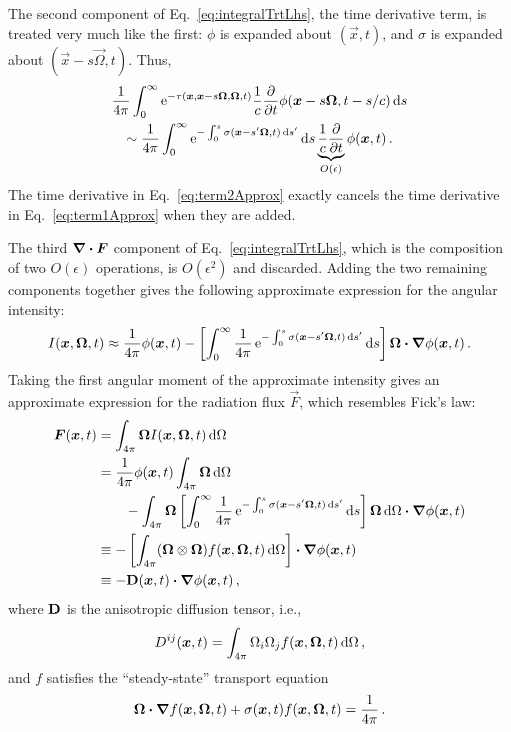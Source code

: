 \documentclass[11pt,letter,twoside]{mc2011}
\newcommand{\Dtens}{\mat{D}}
\begin{document}
The second component of Eq.~\eqref{eq:integralTrtLhs}, the time derivative
term, is treated very much like the first: $\phi$ is expanded about
$(\vec{x},t)$, and $\sigma$ is expanded about $(\vec{x}-s\vec{\Omega},t)$. Thus,
\begin{multline}\label{eq:term2Approx}
  \frac{1}{4\pi}\int_{0}^{\infty} \mathop{}\!\mathrm{e}^{ -\tau(\bm{x}, \bm{x} - s
  \bm{\Omega}, \bm{\Omega}, t)}
  \frac{1}{c} \frac{\partial }{\partial t}\phi(\bm{x} - s \bm{\Omega}, t-s/c) \mathop{}\!\mathrm{d} s
 \\
 \sim 
  \frac{1}{4\pi}\int_{0}^{\infty} \mathop{}\!\mathrm{e}^{- \int_{0}^{s} \sigma(\bm{x}-s'\bm{\Omega}, t)
  \mathop{}\!\mathrm{d} s'} \mathop{}\!\mathrm{d} s
  \underbrace{\frac{1}{c} \frac{\partial }{\partial t}}_{O(\epsilon)}\phi(\bm{x}, t)\,.
\end{multline}
The time derivative in Eq.~\eqref{eq:term2Approx} exactly cancels the time
derivative in Eq.~\eqref{eq:term1Approx} when they are added.

The third $\bm{\nabla} \bm{\cdot} \bm{F}$ component of Eq.~\eqref{eq:integralTrtLhs}, which
is the composition of two $O(\epsilon)$ operations, is $O(\epsilon^2)$ and
discarded. Adding the two remaining components together gives the
following approximate
expression for the angular intensity:
\begin{equation} \label{eq:anisotropicIntensity}
  I(\bm{x}, \bm{\Omega}, t) \approx
  \frac{1}{4\pi}\phi(\bm{x}, t) - \left[ \int_{0}^{\infty} \frac{1}{4\pi}
  \mathop{}\!\mathrm{e}^{- \int_{0}^{s} \sigma(\bm{x}-s'\bm{\Omega}, t)
  \mathop{}\!\mathrm{d} s'} \mathop{}\!\mathrm{d} s\right]
\bm{\Omega} \bm{\cdot} \bm{\nabla} \phi(\bm{x}, t) \,.
\end{equation}
Taking the first angular moment of the approximate intensity gives an
approximate expression for the radiation flux $\vec{F}$, which resembles Fick's
law:
\begin{align}\nonumber
  \vec{F}(\vec{x}, t) &= \int_{4\pi} \vec{\Omega} I(\vec{x}, \vec{\Omega}, t) \ud \Omega
  \\\nonumber
  &=
  \frac{1}{4\pi}\phi(\vec{x}, t) \int_{4\pi} \vec{\Omega} \ud \Omega
  \\\nonumber
  &\qquad-  \int_{4\pi} \vec{\Omega} \left[ \int_{0}^{\infty} \frac{1}{4\pi}
  \eexp^{- \int_{0}^{s} \sigma(\vec{x}-s'\vec{\Omega}, t)
  \ud s'} \ud s\right]
\vec{\Omega}  \ud \Omega \vd \del \phi(\vec{x}, t)
\\\nonumber
&\equiv - \left[ \int_{4\pi} (\vec{\Omega} \otimes \vec{\Omega})  f(\vec{x},\vec{\Omega},t)
 \ud \Omega \right] \vd \del \phi(\vec{x}, t)
 \\\label{eq:adFlux}
&\equiv - \Dtens(\vec{x},t) \vd \del \phi(\vec{x}, t)\,,
\end{align}
where $\Dtens$ is the anisotropic diffusion tensor, i.e.,
\begin{equation} \label{eq:dTensorComponents}
  D^{ij}(\bm{x},t) = \int_{4\pi} \Omega_i \Omega_j f(\bm{x}, \bm{\Omega}, t)
  \mathop{}\!\mathrm{d} \Omega\,,
\end{equation}
and $f$ satisfies the
``steady-state'' transport equation
\begin{equation} \label{eq:dcoeffTransportEquation}
  \bm{\Omega}\bm{\cdot} \bm{\nabla} f(\bm{x},\bm{\Omega},t) + \sigma(\bm{x},t) f(\bm{x},\bm{\Omega},t) =
  \frac{1}{4\pi}\,.
\end{equation}
\end{document}
